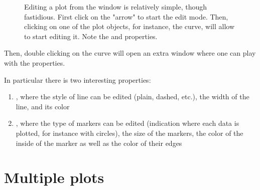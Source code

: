 	\begin{figure}[h!]
		\center
		\caption{
			Editing a plot from the window is relatively simple, though fastidious.
			First click on the "arrow" to start the edit mode. 
			Then, clicking on one of the plot objects, for instance, the curve, will allow to start editing it. 
			Note the  and  properties.
			}
		\label{fig-edit}
		\end{figure}	
	Then, double clicking on the curve will open an extra window where one can play with the properties.

	In particular there is two interesting properties:
	\begin{enumerate}
		\item {}, where the style of line can be edited (plain, dashed, etc.), the width of the line, and its color
		\item {}, where the type of markers can be edited (indication where each data is plotted, for instance with circles), the size of the markers, the color of the inside of the marker as well as the color of their edges
	\end{enumerate}

\section{Multiple plots}
